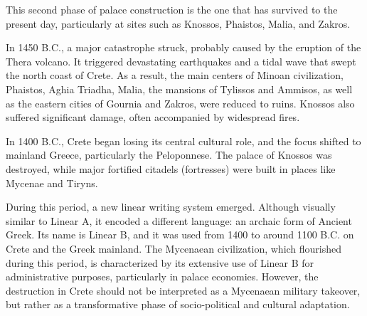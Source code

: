 This second phase of palace construction is the one that has survived to the present day, particularly at sites such as Knossos, Phaistos, Malia, and Zakros.

In 1450 B.C., a major catastrophe struck, probably caused by the eruption of the Thera volcano.
It triggered devastating earthquakes and a tidal wave that swept the north coast of Crete.
As a result, the main centers of Minoan civilization, Phaistos, Aghia Triadha, Malia, the mansions of Tylissos and Ammisos, as well as the eastern cities of Gournia and Zakros, were reduced to ruins.
Knossos also suffered significant damage, often accompanied by widespread fires. \cite{alexiou-ch4}

In 1400 B.C., Crete began losing its central cultural role, and the focus shifted to mainland Greece, particularly the Peloponnese.
The palace of Knossos was destroyed, while major fortified citadels (fortresses) were built in places like Mycenae and Tiryns. \cite{alexiou-ch5}

During this period, a new linear writing system emerged.
Although visually similar to Linear A, it encoded a different language: an archaic form of Ancient Greek.
Its name is Linear B, and it was used from 1400 to around 1100 B.C. on Crete and the Greek mainland.
The Mycenaean civilization, which flourished during this period, is characterized by its extensive use of Linear B for administrative purposes, particularly in palace economies.
However, the destruction in Crete should not be interpreted as a Mycenaean military takeover, but rather as a transformative phase of socio-political and cultural adaptation. \cite{salg-ch5}


